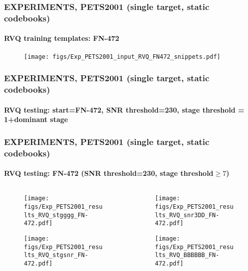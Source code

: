 \begin{frame}
\frametitle{\small EXPERIMENTS, PETS2001 (single target, static codebooks)}
\framesubtitle{RVQ training templates: FN-472}
\mypagenum
	\begin{figure}
		\texttt{[image: figs/Exp\_PETS2001\_input\_RVQ\_FN472\_snippets.pdf]}
	\end{figure}
\end{frame}


\begin{frame}
\frametitle{\small EXPERIMENTS, PETS2001 (single target, static codebooks)}
\framesubtitle{RVQ testing: {\tiny start=FN-472, SNR threshold=230, stage threshold = 1+dominant stage}}
\mypagenum	
\end{frame}




\begin{frame}
\frametitle{\small EXPERIMENTS, PETS2001 (single target, static codebooks)}
\framesubtitle{RVQ testing: FN-472 (SNR threshold=230, stage threshold$\geq 7$)}
	\begin{changemargin}{-1.35in}{0in}
	\begin{columns}
		\begin{column}{1.5in}			
			\begin{figure}
				\texttt{[image: figs/Exp\_PETS2001\_results\_RVQ\_stgggg\_FN-472.pdf]}
			\end{figure}
			\begin{figure}
				\texttt{[image: figs/Exp\_PETS2001\_results\_RVQ\_stgsnr\_FN-472.pdf]}
			\end{figure}
		\end{column}
		\begin{column}{1.5in}
			\begin{figure}
				\texttt{[image: figs/Exp\_PETS2001\_results\_RVQ\_snr3DD\_FN-472.pdf]}
			\end{figure}
			\begin{figure}
				\texttt{[image: figs/Exp\_PETS2001\_results\_RVQ\_BBBBBB\_FN-472.pdf]}
			\end{figure}
		\end{column}
	\end{columns}
	\end{changemargin}
\end{frame}



